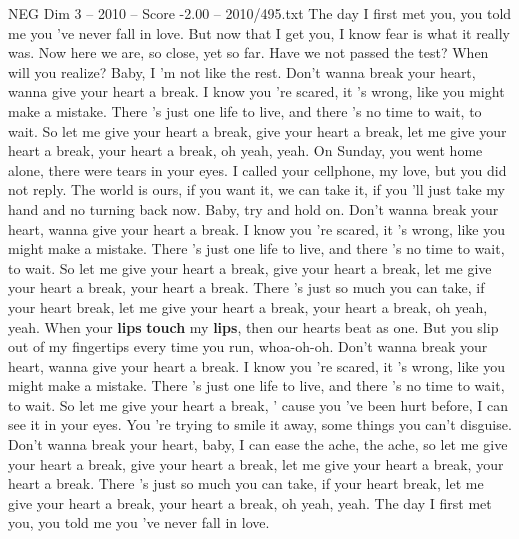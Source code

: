 \begin{textsample}{NEG Dim 3 – 2010 – Score -2.00 – 2010/495.txt}  \label{ex:f3_neg_027}
The day I first met you, you told me you 've never fall in love.
But now that I get you, I know fear is what it really was.
Now here we are, so close, yet so far.
Have we not passed the test?
When will you realize?
Baby, I 'm not like the rest.
Don't wanna break your heart, wanna give your heart a break.
I know you 're scared, it 's wrong, like you might make a mistake.
There 's just one life to live, and there 's no time to wait, to wait.
So let me give your heart a break, give your heart a break, let me give your heart a break, your heart a break, oh yeah, yeah.
On Sunday, you went home alone, there were tears in your eyes.
I called your cellphone, my love, but you did not reply.
The world is ours, if you want it, we can take it, if you 'll just take my hand and no turning back now.
Baby, try and hold on.
Don't wanna break your heart, wanna give your heart a break.
I know you 're scared, it 's wrong, like you might make a mistake.
There 's just one life to live, and there 's no time to wait, to wait.
So let me give your heart a break, give your heart a break, let me give your heart a break, your heart a break.
There 's just so much you can take, if your heart break, let me give your heart a break, your heart a break, oh yeah, yeah.
When your \textbf{lips} \textbf{touch} my \textbf{lips}, then our hearts beat as one.
But you slip out of my fingertips every time you run, whoa-oh-oh.
Don't wanna break your heart, wanna give your heart a break.
I know you 're scared, it 's wrong, like you might make a mistake.
There 's just one life to live, and there 's no time to wait, to wait.
So let me give your heart a break, ' cause you 've been hurt before, I can see it in your eyes.
You 're trying to smile it away, some things you can't disguise.
Don't wanna break your heart, baby, I can ease the ache, the ache, so let me give your heart a break, give your heart a break, let me give your heart a break, your heart a break.
There 's just so much you can take, if your heart break, let me give your heart a break, your heart a break, oh yeah, yeah.
The day I first met you, you told me you 've never fall in love.

\end{textsample}

